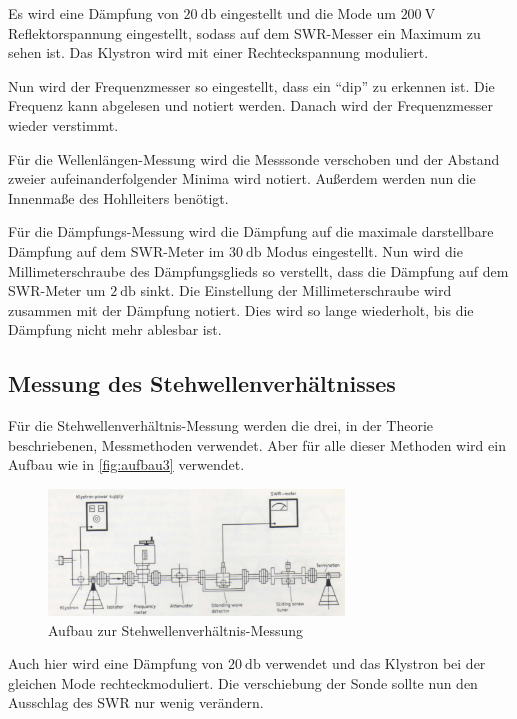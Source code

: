 Es wird eine Dämpfung von $\SI{20}{\decibel}$ eingestellt und die Mode um $\SI{200}{\volt}$ Reflektorspannung eingestellt, sodass auf dem SWR-Messer ein Maximum zu sehen ist.
Das Klystron wird mit einer Rechteckspannung moduliert.

Nun wird der Frequenzmesser so eingestellt, dass ein \enquote{dip} zu erkennen ist.
Die Frequenz kann abgelesen und notiert werden.
Danach wird der Frequenzmesser wieder verstimmt.

Für die Wellenlängen-Messung wird die Messsonde verschoben und der Abstand zweier aufeinanderfolgender Minima wird notiert.
Außerdem werden nun die Innenmaße des Hohlleiters benötigt.

Für die Dämpfungs-Messung wird die Dämpfung auf die maximale darstellbare Dämpfung auf dem SWR-Meter im $\SI{30}{\decibel}$ Modus eingestellt.
Nun wird die Millimeterschraube des Dämpfungsglieds so verstellt, dass die Dämpfung auf dem SWR-Meter um $\SI{2}{\decibel}$ sinkt.
Die Einstellung der Millimeterschraube wird zusammen mit der Dämpfung notiert.
Dies wird so lange wiederholt, bis die Dämpfung nicht mehr ablesbar ist.

\subsection{Messung des Stehwellenverhältnisses}
\label{ssec:Messung_SWR}

Für die Stehwellenverhältnis-Messung werden die drei, in der Theorie beschriebenen, Messmethoden verwendet.
Aber für alle dieser Methoden wird ein Aufbau wie in \autoref{fig:aufbau3} verwendet.

\begin{figure}
    \centering
    \includegraphics[width=0.7\textwidth]{images/aufbau3.png}
    \caption{Aufbau zur Stehwellenverhältnis-Messung \cite{V53_old}}
    \label{fig:aufbau3}
\end{figure}

Auch hier wird eine Dämpfung von $\SI{20}{\decibel}$ verwendet und das Klystron bei der gleichen Mode rechteckmoduliert.
Die verschiebung der Sonde sollte nun den Ausschlag des SWR nur wenig verändern.

